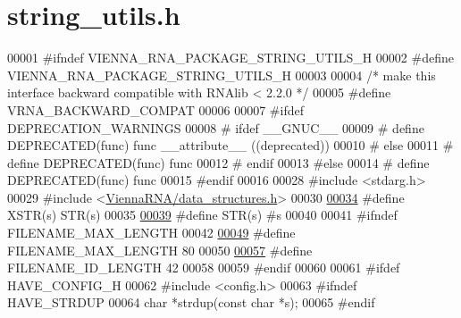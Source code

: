 \hypertarget{string__utils_8h_source}{}\section{string\+\_\+utils.\+h}
\label{string__utils_8h_source}

\begin{DoxyCode}
00001 \textcolor{preprocessor}{#ifndef VIENNA\_RNA\_PACKAGE\_STRING\_UTILS\_H}
00002 \textcolor{preprocessor}{#define VIENNA\_RNA\_PACKAGE\_STRING\_UTILS\_H}
00003 
00004 \textcolor{comment}{/* make this interface backward compatible with RNAlib < 2.2.0 */}
00005 \textcolor{preprocessor}{#define VRNA\_BACKWARD\_COMPAT}
00006 
00007 \textcolor{preprocessor}{#ifdef DEPRECATION\_WARNINGS}
00008 \textcolor{preprocessor}{# ifdef \_\_GNUC\_\_}
00009 \textcolor{preprocessor}{#  define DEPRECATED(func) func \_\_attribute\_\_ ((deprecated))}
00010 \textcolor{preprocessor}{# else}
00011 \textcolor{preprocessor}{#  define DEPRECATED(func) func}
00012 \textcolor{preprocessor}{# endif}
00013 \textcolor{preprocessor}{#else}
00014 \textcolor{preprocessor}{# define DEPRECATED(func) func}
00015 \textcolor{preprocessor}{#endif}
00016 
00028 \textcolor{preprocessor}{#include <stdarg.h>}
00029 \textcolor{preprocessor}{#include <\hyperlink{data__structures_8h}{ViennaRNA/data\_structures.h}>}
00030 
\hypertarget{string__utils_8h_source.tex_l00034}{}\hyperlink{group__string__utils_ga03943706e48069237cd57f2d35ca987e}{00034} \textcolor{preprocessor}{#define XSTR(s) STR(s)}
00035 
\hypertarget{string__utils_8h_source.tex_l00039}{}\hyperlink{group__string__utils_ga6388870e639eee9c0a69446876f1f8cc}{00039} \textcolor{preprocessor}{#define STR(s) #s}
00040 
00041 \textcolor{preprocessor}{#ifndef FILENAME\_MAX\_LENGTH}
00042 
\hypertarget{string__utils_8h_source.tex_l00049}{}\hyperlink{group__string__utils_gafb228174279df9486a5cb56ac0bc79a3}{00049} \textcolor{preprocessor}{#define FILENAME\_MAX\_LENGTH   80}
00050 
\hypertarget{string__utils_8h_source.tex_l00057}{}\hyperlink{group__string__utils_ga33c3b1826b8e2739f09f111ec719ded5}{00057} \textcolor{preprocessor}{#define FILENAME\_ID\_LENGTH    42}
00058 
00059 \textcolor{preprocessor}{#endif}
00060 
00061 \textcolor{preprocessor}{#ifdef HAVE\_CONFIG\_H}
00062 \textcolor{preprocessor}{#include <config.h>}
00063 \textcolor{preprocessor}{#ifndef HAVE\_STRDUP}
00064 \textcolor{keywordtype}{char} *strdup(\textcolor{keyword}{const} \textcolor{keywordtype}{char} *s);
00065 \textcolor{preprocessor}{#endif}

\end{DoxyCode}

